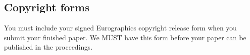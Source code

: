 \documentclass{egpubl}
\begin{document}
\subsection{Copyright forms}

You must include your signed Eurographics copyright release form
when you submit your finished paper. We MUST have this form before
your paper can be published in the proceedings.





\end{document}
